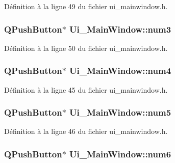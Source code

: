 \-Définition à la ligne 49 du fichier ui\-\_\-mainwindow.\-h.

\hypertarget{class_ui___main_window_a1cba0408985417af8b8f84ecf490f251}{
\subsubsection[{num3}]{\setlength{\rightskip}{0pt plus 5cm}\-Q\-Push\-Button$\ast$ {\bf \-Ui\-\_\-\-Main\-Window\-::num3}}}\label{class_ui___main_window_a1cba0408985417af8b8f84ecf490f251}


\-Définition à la ligne 50 du fichier ui\-\_\-mainwindow.\-h.

\hypertarget{class_ui___main_window_acec9d7e0484591592b5b5aebe17c4d4c}{
\subsubsection[{num4}]{\setlength{\rightskip}{0pt plus 5cm}\-Q\-Push\-Button$\ast$ {\bf \-Ui\-\_\-\-Main\-Window\-::num4}}}\label{class_ui___main_window_acec9d7e0484591592b5b5aebe17c4d4c}


\-Définition à la ligne 45 du fichier ui\-\_\-mainwindow.\-h.

\hypertarget{class_ui___main_window_ae2cb73580dc5ebe9ff8bfdeb0be7fa4d}{
\subsubsection[{num5}]{\setlength{\rightskip}{0pt plus 5cm}\-Q\-Push\-Button$\ast$ {\bf \-Ui\-\_\-\-Main\-Window\-::num5}}}\label{class_ui___main_window_ae2cb73580dc5ebe9ff8bfdeb0be7fa4d}


\-Définition à la ligne 46 du fichier ui\-\_\-mainwindow.\-h.

\hypertarget{class_ui___main_window_a45c01137210fb27261aaa19e878b2771}{
\subsubsection[{num6}]{\setlength{\rightskip}{0pt plus 5cm}\-Q\-Push\-Button$\ast$ {\bf \-Ui\-\_\-\-Main\-Window\-::num6}}}\label{class_ui___main_window_a45c01137210fb27261aaa19e878b2771}


